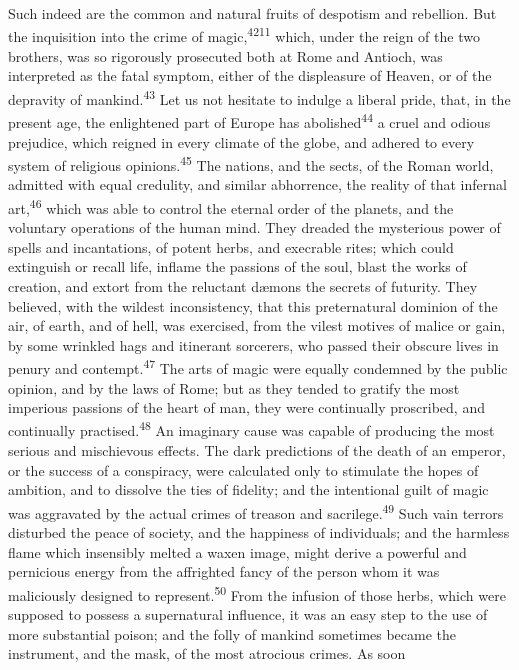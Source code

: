 {{{{{{{{{{{{{{{{{{{{{{{{{{{{{{{{{{{{{{{{{{{{{{{Such indeed are the common and natural fruits of despotism and
rebellion. But the inquisition into the crime of magic,\textsuperscript{4211}
which, under the reign of the two brothers, was so rigorously
prosecuted both at Rome and Antioch, was interpreted as the fatal
symptom, either of the displeasure of Heaven, or of the depravity
of mankind.\textsuperscript{43} Let us not hesitate to indulge a liberal pride,
that, in the present age, the enlightened part of Europe has
abolished\textsuperscript{44} a cruel and odious prejudice, which reigned in every
climate of the globe, and adhered to every system of religious
opinions.\textsuperscript{45} The nations, and the sects, of the Roman world,
admitted with equal credulity, and similar abhorrence, the
reality of that infernal art,\textsuperscript{46} which was able to control the
eternal order of the planets, and the voluntary operations of the
human mind. They dreaded the mysterious power of spells and
incantations, of potent herbs, and execrable rites; which could
extinguish or recall life, inflame the passions of the soul,
blast the works of creation, and extort from the reluctant dæmons
the secrets of futurity. They believed, with the wildest
inconsistency, that this preternatural dominion of the air, of
earth, and of hell, was exercised, from the vilest motives of
malice or gain, by some wrinkled hags and itinerant sorcerers,
who passed their obscure lives in penury and contempt.\textsuperscript{47} The
arts of magic were equally condemned by the public opinion, and
by the laws of Rome; but as they tended to gratify the most
imperious passions of the heart of man, they were continually
proscribed, and continually practised.\textsuperscript{48} An imaginary cause was
capable of producing the most serious and mischievous effects.
The dark predictions of the death of an emperor, or the success
of a conspiracy, were calculated only to stimulate the hopes of
ambition, and to dissolve the ties of fidelity; and the
intentional guilt of magic was aggravated by the actual crimes of
treason and sacrilege.\textsuperscript{49} Such vain terrors disturbed the peace
of society, and the happiness of individuals; and the harmless
flame which insensibly melted a waxen image, might derive a
powerful and pernicious energy from the affrighted fancy of the
person whom it was maliciously designed to represent.\textsuperscript{50} From the
infusion of those herbs, which were supposed to possess a
supernatural influence, it was an easy step to the use of more
substantial poison; and the folly of mankind sometimes became the
instrument, and the mask, of the most atrocious crimes. As soon
}}}}}}}}}}}}}}}}}}}}}}}}}}}}}}}}}}}}}}}}}}}}}}}
